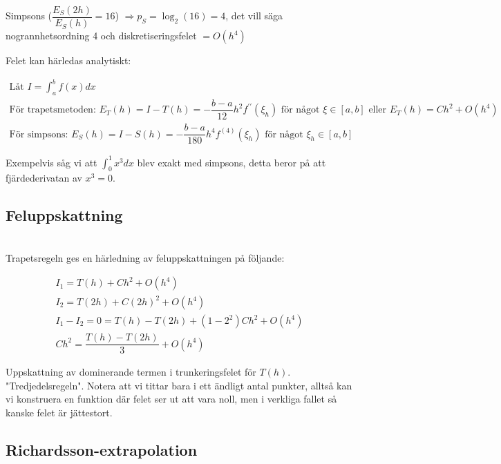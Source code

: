\noindent Simpsons ($\dfrac{E_S(2h)}{E_S(h)}=16$) $\Rightarrow p_S=\log_2(16)=4$, det vill säga nogrannhetsordning 4 och diskretiseringsfelet $=O(h^4)$
\par\bigskip

\noindent Felet kan härledas analytiskt:


\begin{equation*}
  \begin{gathered}
    \text{Låt } I = \int_{a}^{b}f(x)dx\\
    \text{För trapetsmetoden: } E_T(h)=I-T(h)=-\dfrac{b-a}{12}h^2f^{\prime\prime}(\xi_h) \text{ för något $\xi\in[a,b]$ eller } E_T(h)=Ch^2+O(h^4)\\
    \text{För simpsons: } E_S(h)=I-S(h)=-\dfrac{b-a}{180}h^4f^{(4)}(\xi_h) \text{ för något $\xi_h\in[a,b]$}
  \end{gathered}
\end{equation*}

\noindent Exempelvis såg vi att $\int_{0}^{1}x^3dx$ blev exakt med simpsons, detta beror på att fjärdederivatan av $x^3=0$.
\par\bigskip

\subsection{Feluppskattning}\hfill\\

\noindent Trapetsregeln ges en härledning av feluppskattningen på följande:


\begin{equation*}
  \begin{gathered}
    I_1 = T(h)+Ch^2+O(h^4)\\
    I_2 = T(2h)+C(2h)^2+O(h^4)\\
    I_1-I_2 = 0 = T(h)-T(2h)+(1-2^2)Ch^2 + O(h^4)\\
    Ch^2 = \dfrac{T(h)-T(2h)}{3}+O(h^4)
  \end{gathered}
\end{equation*}
\par\bigskip
\noindent Uppskattning av dominerande termen i trunkeringsfelet för $T(h)$. "Tredjedelsregeln". Notera att vi tittar bara i ett ändligt antal punkter, alltså kan vi konstruera en funktion där felet ser ut att vara noll, men i verkliga fallet så kanske felet är jättestort.
\par\bigskip

\subsection{Richardsson-extrapolation}\hfill\\

